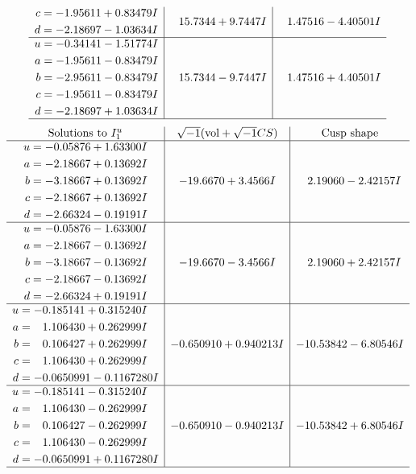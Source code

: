 \documentclass[1p]{elsarticle_modified}
\theoremstyle{definition}
\newcommand{\I}{\sqrt{-1}}
\begin{document}
$$\begin{array}{c|c|c}
\begin{aligned}
c &= -1.95611 + 0.83479 I \\
d &= -2.18697 - 1.03634 I\end{aligned}
 & \phantom{-}15.7344 + 9.7447 I & \phantom{-}1.47516 - 4.40501 I \\ \hline\begin{aligned}
u &= -0.34141 - 1.51774 I \\
a &= -1.95611 - 0.83479 I \\
b &= -2.95611 - 0.83479 I \\
c &= -1.95611 - 0.83479 I \\
d &= -2.18697 + 1.03634 I\end{aligned}
 & \phantom{-}15.7344 - 9.7447 I & \phantom{-}1.47516 + 4.40501 I\\
 \hline 
 \end{array}$$\newpage$$\begin{array}{c|c|c}  
\text{Solutions to }I^u_{1}& \I (\text{vol} + \sqrt{-1}CS) & \text{Cusp shape}\\
 \hline 
\begin{aligned}
u &= -0.05876 + 1.63300 I \\
a &= -2.18667 + 0.13692 I \\
b &= -3.18667 + 0.13692 I \\
c &= -2.18667 + 0.13692 I \\
d &= -2.66324 - 0.19191 I\end{aligned}
 & -19.6670 + 3.4566 I & \phantom{-}2.19060 - 2.42157 I \\ \hline\begin{aligned}
u &= -0.05876 - 1.63300 I \\
a &= -2.18667 - 0.13692 I \\
b &= -3.18667 - 0.13692 I \\
c &= -2.18667 - 0.13692 I \\
d &= -2.66324 + 0.19191 I\end{aligned}
 & -19.6670 - 3.4566 I & \phantom{-}2.19060 + 2.42157 I \\ \hline\begin{aligned}
u &= -0.185141 + 0.315240 I \\
a &= \phantom{-}1.106430 + 0.262999 I \\
b &= \phantom{-}0.106427 + 0.262999 I \\
c &= \phantom{-}1.106430 + 0.262999 I \\
d &= -0.0650991 - 0.1167280 I\end{aligned}
 & -0.650910 + 0.940213 I & -10.53842 - 6.80546 I \\ \hline\begin{aligned}
u &= -0.185141 - 0.315240 I \\
a &= \phantom{-}1.106430 - 0.262999 I \\
b &= \phantom{-}0.106427 - 0.262999 I \\
c &= \phantom{-}1.106430 - 0.262999 I \\
d &= -0.0650991 + 0.1167280 I\end{aligned}
 & -0.650910 - 0.940213 I & -10.53842 + 6.80546 I\\
 \hline 
 \end{array}$$\newpage\newpage\renewcommand{\arraystretch}{1}
\end{document}
